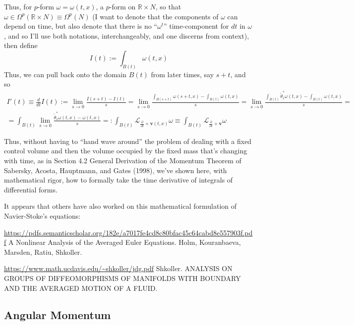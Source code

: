 \documentclass[twoside,landscape,10pt]{amsart}
\theoremstyle{plain}
\theoremstyle{definition}
\theoremstyle{remark}
\theoremstyle{remark}
\begin{document}
\begin{multicols*}{2}
Thus, for $p$-form $\omega = \omega(t,x)$, a $p$-form on $\mathbb{R} \times N$, so that $\omega \in \Omega^p(\mathbb{R} \times N) \equiv \Omega^p(N)$ (I want to denote that the components of $\omega$ can depend on time, but also denote that there is no ``$\omega^t$'' time-component for $dt$ in $\omega$, and so I'll use both notations, interchangeably, and one discerns from context), then define 
\[
I(t) := \int_{ B(t)} \omega(t,x)
\]  
Thus, we can pull back onto the domain $B(t)$ from later times, say $s+t$, and so
\[
\begin{gathered}
  I'(t) \equiv \frac{d}{dt} I(t) := \lim_{s\to 0} \frac{ I(s+t) -I(t) }{ s} = \lim_{s\to 0} \frac{ \int_{B(s+t)} \omega(s+t,x) - \int_{B(t)} \omega(t,x) }{ s} = \lim_{s\to 0} \frac{ \int_{B(t) } \widetilde{\theta}^*_s\omega(t,x) - \int_{B(t)} \omega(t,x) }{s} = \\
   = \int_{B(t)} \lim_{s\to 0} \frac{ \widetilde{\theta}_s^* \omega(t,x) - \omega(t,x) }{ s }  =: \int_{B(t)} \mathcal{L}_{\frac{ \partial }{ \partial t } + \mathbf{v}(t,x) } \omega \equiv \int_{B(t)} \mathcal{L}_{\frac{ \partial }{\partial t} + \mathbf{v} } \omega
\end{gathered}
\]

Thus, without having to ``hand wave around'' the problem of dealing with a fixed control volume and then the volume occupied by the fixed mass that's changing with time, as in Section 4.2 General Derivation of the Momentum Theorem of Sabersky, Acosta, Hauptmann, and Gates (1998)\cite{SAHG1998}, we've shown here, with mathematical rigor, how to formally take the time derivative of integrals of differential forms.  

It appears that others have also worked on this mathematical formulation of Navier-Stoke's equations:

\url{https://pdfs.semanticscholar.org/182e/a7017fe4cd8c80bfac45c64cabd8e557903f.pdf}
A Nonlinear Analysis of the Averaged Euler Equations.  Holm, Kouranbaeva, Marsden, Ratiu, Shkoller.  

\url{https://www.math.ucdavis.edu/~shkoller/jdg.pdf}  Shkoller.  ANALYSIS ON GROUPS OF DIFFEOMORPHISMS
OF MANIFOLDS WITH BOUNDARY AND THE AVERAGED MOTION OF A FLUID.  





\subsection{Angular Momentum}


\end{multicols*}
\end{document}
